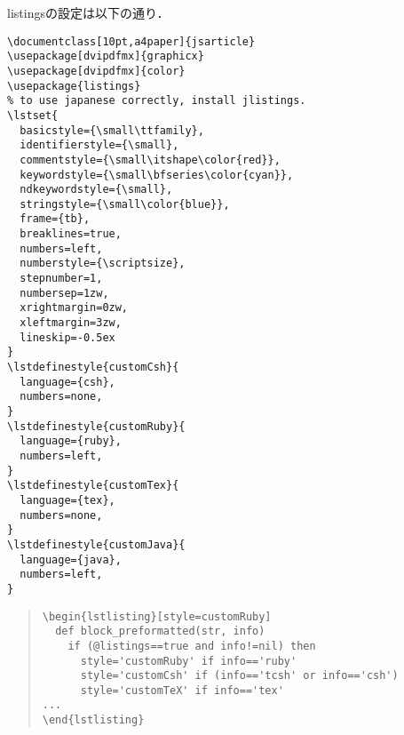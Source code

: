 listingsの設定は以下の通り．
\begin{lstlisting}[style=customTeX]
\documentclass[10pt,a4paper]{jsarticle}
\usepackage[dvipdfmx]{graphicx}
\usepackage[dvipdfmx]{color}
\usepackage{listings}
% to use japanese correctly, install jlistings.
\lstset{
  basicstyle={\small\ttfamily},
  identifierstyle={\small},
  commentstyle={\small\itshape\color{red}},
  keywordstyle={\small\bfseries\color{cyan}},
  ndkeywordstyle={\small},
  stringstyle={\small\color{blue}},
  frame={tb},
  breaklines=true,
  numbers=left,
  numberstyle={\scriptsize},
  stepnumber=1,
  numbersep=1zw,
  xrightmargin=0zw,
  xleftmargin=3zw,
  lineskip=-0.5ex
}
\lstdefinestyle{customCsh}{
  language={csh},
  numbers=none,
}
\lstdefinestyle{customRuby}{
  language={ruby},
  numbers=left,
}
\lstdefinestyle{customTex}{
  language={tex},
  numbers=none,
}
\lstdefinestyle{customJava}{
  language={java},
  numbers=left,
}
\end{lstlisting}\begin{quote}\begin{verbatim}
\begin{lstlisting}[style=customRuby]
  def block_preformatted(str, info)
    if (@listings==true and info!=nil) then
      style='customRuby' if info=='ruby'
      style='customCsh' if (info=='tcsh' or info=='csh')
      style='customTeX' if info=='tex'
...
\end{lstlisting}
\end{verbatim}\end{quote}
